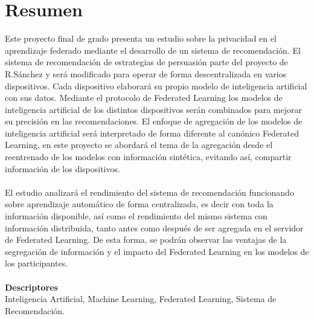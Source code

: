 \chapter*{Resumen}

\thispagestyle{fancy}

Este proyecto final de grado presenta un estudio sobre la privacidad en el aprendizaje federado mediante el desarrollo de un sistema de recomendación. El sistema de recomendación de estrategias de persuasión parte del proyecto de R.Sánchez\autocite{sanchez-corcueraPersuasionbasedRecommenderSystem2020} y será modificado para operar de forma descentralizada en varios dispositivos. Cada dispositivo elaborará su propio modelo de inteligencia artificial con sus datos. Mediante el protocolo de Federated Learning los modelos de inteligencia artificial de los distintos dispositivos serán combinados para mejorar su precisión en las recomendaciones. El enfoque de agregación de los modelos de inteligencia artificial será interpretado de forma diferente al canónico Federated Learning, en este proyecto se abordará el tema de la agregación desde el reentrenado de los modelos con información sintética, evitando así, compartir información de los dispositivos.
\\\\
El estudio analizará el rendimiento del sistema de recomendación funcionando sobre aprendizaje automático de forma centralizada, es decir con toda la información disponible, así como el rendimiento del mismo sistema con información distribuida, tanto antes como después de ser agregada en el servidor de Federated Learning. De esta forma, se podrán observar las ventajas de la segregación de información y el impacto del Federated Learning en los modelos de los participantes.
\\\\
\textbf{Descriptores}\\
Inteligencia Artificial, Machine Learning, Federated Learning, Sistema de Recomendación.